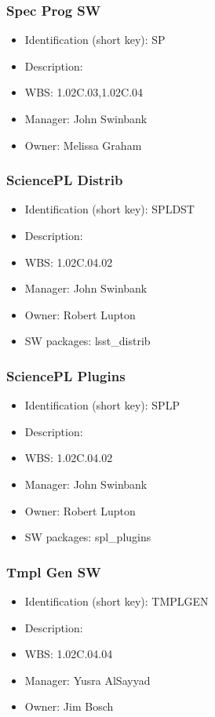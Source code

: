\subsubsection{Spec Prog SW}\label{sect:SP}
\begin{itemize}
\item Identification (short key): SP
\item Description: 
\item WBS: 1.02C.03,1.02C.04
\item Manager: John Swinbank
\item Owner: Melissa Graham
\end{itemize}

\subsubsection{SciencePL Distrib}\label{sect:SPLDST}
\begin{itemize}
\item Identification (short key): SPLDST
\item Description: 
\item WBS: 1.02C.04.02
\item Manager: John Swinbank
\item Owner: Robert Lupton
\item SW packages: lsst\_distrib
\end{itemize}

\subsubsection{SciencePL Plugins}\label{sect:SPLP}
\begin{itemize}
\item Identification (short key): SPLP
\item Description: 
\item WBS: 1.02C.04.02
\item Manager: John Swinbank
\item Owner: Robert Lupton
\item SW packages: spl\_plugins
\end{itemize}

\subsubsection{Tmpl Gen SW}\label{sect:TMPLGEN}
\begin{itemize}
\item Identification (short key): TMPLGEN
\item Description: 
\item WBS: 1.02C.04.04
\item Manager: Yusra AlSayyad
\item Owner: Jim Bosch
\end{itemize}


